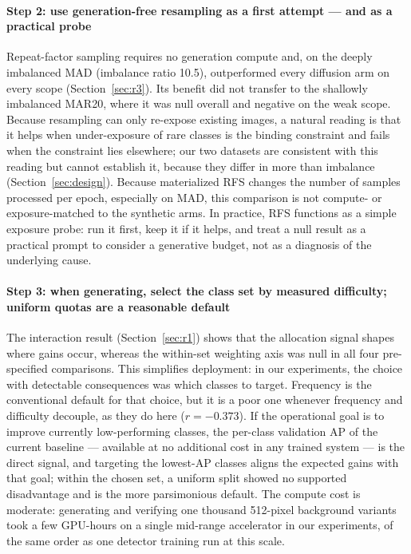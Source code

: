 \documentclass[preprint,12pt,authoryear]{elsarticle}
\begin{document}
\paragraph{Step 2: use generation-free resampling as a first attempt --- and as a practical probe}
Repeat-factor sampling requires no generation compute and, on the deeply
imbalanced MAD (imbalance ratio 10.5), outperformed every diffusion arm
on every scope (Section~\ref{sec:r3}). Its benefit did not transfer to
the shallowly imbalanced MAR20, where it was null overall and negative
on the weak scope. Because resampling can only re-expose existing
images, a natural reading is that it helps when under-exposure of rare
classes is the binding constraint and fails when the constraint lies
elsewhere; our two datasets are consistent with this reading but cannot
establish it, because they differ in more than imbalance
(Section~\ref{sec:design}).
Because materialized RFS changes the number of samples processed per
epoch, especially on MAD, this comparison is not compute- or
exposure-matched to the synthetic arms. In practice, RFS functions as a
simple exposure probe: run it first, keep it if
it helps, and treat a null result as a
practical prompt to consider a generative budget, not as a diagnosis
of the underlying cause.

\paragraph{Step 3: when generating, select the class set by
measured difficulty; uniform quotas are a reasonable default}
The interaction result (Section~\ref{sec:r1}) shows that the allocation
signal shapes where gains occur, whereas the within-set weighting
axis was null in all four pre-specified comparisons. This simplifies
deployment: in our experiments, the choice with detectable
consequences was which classes to target. Frequency is the conventional default for that choice, but it
is a poor one whenever frequency and difficulty decouple, as they do
here ($r = -0.373$). If the operational goal is to improve currently low-performing
classes, the per-class validation AP of the current baseline ---
available at no additional cost in any trained system --- is the direct
signal, and targeting the lowest-AP classes aligns the expected gains
with that goal; within the chosen set, a
uniform split showed no supported disadvantage and is the more
parsimonious default. The compute cost is moderate: generating and verifying one
thousand 512-pixel background variants took a few GPU-hours on a single
mid-range accelerator in our experiments, of the same order as one
detector training run at this scale.
\end{document}
